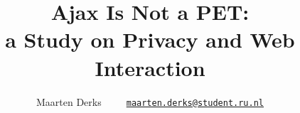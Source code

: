 \documentclass[a4paper]{article}
\title{Ajax Is Not a PET:\\ a Study on Privacy and Web Interaction}
\author{Maarten Derks~~~~~\href{mailto:maarten.derks@student.ru.nl}{\nolinkurl{maarten.derks@student.ru.nl}}}
\begin{document}
	\maketitle
	
	
	
	
	
	
		

    \nocite{*}
    
	
	
\end{document}
